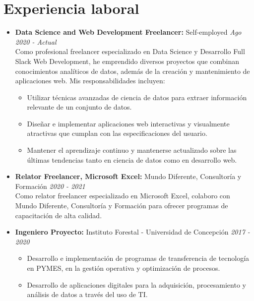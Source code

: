 \documentclass[a4paper,10pt]{article}
\begin{document}
	
	\section*{Experiencia laboral}
		\begin{itemize}[left=0pt]
			\item \textbf{\large Data Science and Web Development Freelancer:} Self-employed \hfill \textit{Ago 2020 - Actual} \\
			\small Como profesional freelancer especializado en Data Science y Desarrollo Full Slack Web Development, he emprendido diversos proyectos que combinan conocimientos analíticos de datos, además de la creación y mantenimiento de aplicaciones web. Mis responsabilidades incluyen:
			\begin{itemize}[left=10pt]
				\item Utilizar técnicas avanzadas de ciencia de datos para extraer información relevante de un conjunto de datos.
				\item Diseñar e implementar aplicaciones web interactivas y visualmente atractivas que cumplan con las especificaciones del usuario.
				\item Mantener el aprendizaje continuo y mantenerse actualizado sobre las últimas tendencias tanto en ciencia de datos como en desarrollo web.
			\end{itemize}
			
			\item \textbf{\large Relator Freelancer, Microsoft Excel:} Mundo Diferente, Consultoría y Formación \hfill \textit{2020 - 2021} \\
			\small Como relator freelancer especializado en Microsoft Excel, colaboro con Mundo Diferente, Consultoría y Formación para ofrecer programas de capacitación de alta calidad. 
			
			\item \textbf{\large Ingeniero Proyecto:} Instituto Forestal - Universidad de Concepción \hfill \textit{2017 - 2020}
			\begin{itemize}[left=10pt, topsep=0pt]
				\item Desarrollo e implementación de programas de transferencia de tecnología en PYMES, en la gestión operativa y optimización de procesos.
				\item Desarrollo de aplicaciones digitales para la adquisición, procesamiento y análisis de datos a través del uso de TI.
			\end{itemize}
		

\end{itemize}
\end{document}
